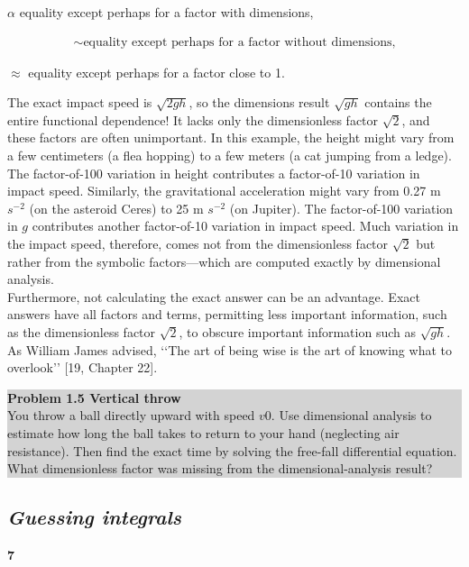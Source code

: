 \documentclass[a4paper]{article}
\numberwithin{equation}{section}
\begin{document}
\begin{center}
$\alpha$ \textrm{equality except perhaps for a factor with dimensions,}
\end{center}
\begin{eqnarray}
\sim \textrm{equality except perhaps for a factor without dimensions,}
\end{eqnarray}
\begin{center}
$\approx$ \textrm{equality except perhaps for a factor close to 1.}
\end{center}
The exact impact speed is $\sqrt{2gh}$, so the dimensions result $\sqrt{gh}$ contains
the entire functional dependence! It lacks only the dimensionless factor
$\sqrt{2}$, and these factors are often unimportant. In this example, the height
might vary from a few centimeters (a flea hopping) to a few meters (a cat
jumping from a ledge). The factor-of-100 variation in height contributes
a factor-of-10 variation in impact speed. Similarly, the gravitational acceleration
might vary from 0.27 m $s^{-2}$ (on the asteroid Ceres) to 25 m $s^{-2}$ (on
Jupiter). The factor-of-100 variation in $g$ contributes another factor-of-10
variation in impact speed. Much variation in the impact speed, therefore,
comes not from the dimensionless factor $\sqrt{2}$  but rather from the symbolic
factors—which are computed exactly by dimensional analysis.
\\

Furthermore, not calculating the exact answer can be an advantage. Exact
answers have all factors and terms, permitting less important information,
such as the dimensionless factor $\sqrt{2}$, to obscure important information
such as $\sqrt{gh}$. As William James advised, ‘‘The art of being wise is the art
of knowing what to overlook’’
[19, Chapter 22].
\\

\colorbox{lightgray}{
\begin{minipage}{\textwidth}
 {\normalsize\textbf{Problem 1.5 Vertical throw}
 \\
You throw a ball directly upward with speed $v0$. Use dimensional analysis to
estimate how long the ball takes to return to your hand (neglecting air resistance).
Then find the exact time by solving the free-fall differential equation. What
dimensionless factor was missing from the dimensional-analysis result?}
\end{minipage}
}

\newpage
\subsection{\textit{Guessing integrals}}\hfill \textbf{7} \\ 
\end{document}
